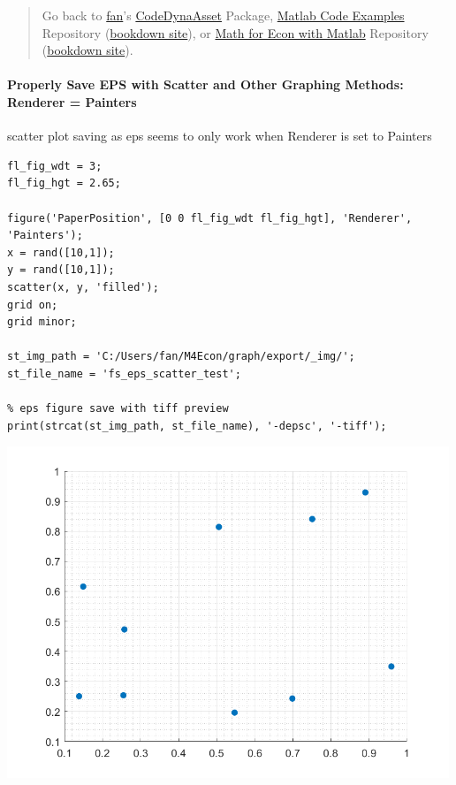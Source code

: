 \documentclass[
]{book}
\begin{document}
\begin{quote}
Go back to \href{http://fanwangecon.github.io/}{fan}'s \href{https://fanwangecon.github.io/CodeDynaAsset/}{CodeDynaAsset} Package, \href{https://fanwangecon.github.io/M4Econ/}{Matlab Code Examples} Repository (\href{https://fanwangecon.github.io/M4Econ/bookdown}{bookdown site}), or \href{https://fanwangecon.github.io/Math4Econ/}{Math for Econ with Matlab} Repository (\href{https://fanwangecon.github.io/Math4Econ/bookdown}{bookdown site}).
\end{quote}

\hypertarget{properly-save-eps-with-scatter-and-other-graphing-methods-renderer-painters}{%
\paragraph{Properly Save EPS with Scatter and Other Graphing Methods: Renderer = Painters}\label{properly-save-eps-with-scatter-and-other-graphing-methods-renderer-painters}}

scatter plot saving as eps seems to only work when Renderer is set to
Painters

\begin{verbatim}
fl_fig_wdt = 3;
fl_fig_hgt = 2.65;

figure('PaperPosition', [0 0 fl_fig_wdt fl_fig_hgt], 'Renderer', 'Painters');
x = rand([10,1]);
y = rand([10,1]);
scatter(x, y, 'filled');
grid on;
grid minor;

st_img_path = 'C:/Users/fan/M4Econ/graph/export/_img/';
st_file_name = 'fs_eps_scatter_test';

% eps figure save with tiff preview
print(strcat(st_img_path, st_file_name), '-depsc', '-tiff');
\end{verbatim}

\includegraphics[width=5.20833in,height=\textheight]{img/fs_eps_images/figure_0.png}
\end{document}
